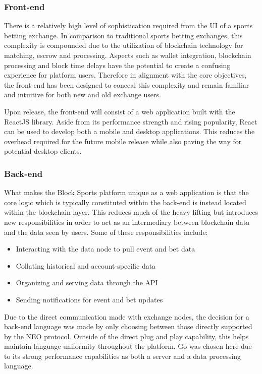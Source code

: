 \documentclass{article}
\begin{document}
		\subsubsection{Front-end} \label{front-end}
There is a relatively high level of sophistication required from the UI of a sports betting exchange. In comparison to traditional sports betting exchanges, this complexity is compounded due to the utilization of blockchain technology for matching, escrow and processing. Aspects such as wallet integration, blockchain processing and block time delays have the potential to create a confusing experience for platform users. Therefore in alignment with the core objectives, the front-end has been designed to conceal this complexity and remain familiar and intuitive for both new and old exchange users.

Upon release, the front-end will consist of a web application built with the ReactJS library. Aside from its performance strength and rising popularity, React can be used to develop both a mobile and desktop applications. This reduces the overhead required for the future mobile release while also paving the way for potential desktop clients.

		\subsubsection{Back-end} \label{back-end}
What makes the Block Sports platform unique as a web application is that the core logic which is typically constituted within the back-end is instead located within the blockchain layer. This reduces much of the heavy lifting but introduces new responsibilities in order to act as an intermediary between blockchain data and the data seen by users. Some of these responsibilities include:

\begin{itemize}
	\item Interacting with the data node to pull event and bet data
	\item Collating historical and account-specific data
	\item Organizing and serving data through the API
	\item Sending notifications for event and bet updates
\end{itemize}

Due to the direct communication made with exchange nodes, the decision for a back-end language was made by only choosing between those directly supported by the NEO protocol. Outside of the direct plug and play capability, this helps maintain language uniformity throughout the platform. Go was chosen here due to its strong performance capabilities as both a server and a data processing language.
\end{document}
